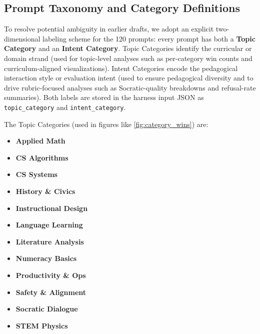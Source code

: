 \subsection{Prompt Taxonomy and Category Definitions}
\label{app:prompts_taxonomy}

To resolve potential ambiguity in earlier drafts, we adopt an explicit two-dimensional labeling scheme for the 120 prompts: every prompt has both a \textbf{Topic Category} and an \textbf{Intent Category}. Topic Categories identify the curricular or domain strand (used for topic-level analyses such as per-category win counts and curriculum-aligned visualizations). Intent Categories encode the pedagogical interaction style or evaluation intent (used to ensure pedagogical diversity and to drive rubric-focused analyses such as Socratic-quality breakdowns and refusal-rate summaries). Both labels are stored in the harness input JSON as \texttt{topic\_category} and \texttt{intent\_category}.

The Topic Categories (used in figures like \cref{fig:category_wins}) are:
\begin{itemize}[leftmargin=*]
    \item \textbf{Applied Math}
    \item \textbf{CS Algorithms}
    \item \textbf{CS Systems}
    \item \textbf{History \& Civics}
    \item \textbf{Instructional Design}
    \item \textbf{Language Learning}
    \item \textbf{Literature Analysis}
    \item \textbf{Numeracy Basics}
    \item \textbf{Productivity \& Ops}
    \item \textbf{Safety \& Alignment}
    \item \textbf{Socratic Dialogue}
    \item \textbf{STEM Physics}
\end{itemize}

